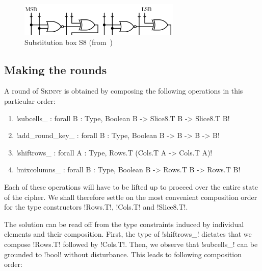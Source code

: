 \documentclass[draft,english]{jflart}
\newcommand{\Skinny}{\textsc{Skinny}}
\begin{document}
\begin{figure}
  \centering
  \includegraphics[draft=false,width=.75\textwidth]{s8}
  \caption{Substitution box S8 (from~\citet{beierle:skinny})}
  \label{fig:s8}
\end{figure}

\subsection{Making the rounds}
\label{sec:assembling}


A round of \Skinny{} is obtained by composing the following operations in
this particular order:
%
\begin{enumerate}
\item \coqe!subcells_ : forall {B : Type}, Boolean B -> Slice8.T B -> Slice8.T B!
\item \coqe!add_round_key_ : forall {B : Type}, Boolean B -> B -> B -> B!
\item \coqe!shiftrows_ : forall {A : Type}, Rows.T (Cols.T A -> Cols.T A)!
\item \coqe!mixcolumns_ : forall {B : Type}, Boolean B -> Rows.T B -> Rows.T B!
\end{enumerate}

Each of these operations will have to be lifted up to proceed over the
entire state of the cipher. We shall therefore settle on the most
convenient composition order for the type constructors \coqe!Rows.T!,
\coqe!Cols.T! and \coqe!Slice8.T!.


The solution can be read off from the type constraints induced by
individual elements and their composition. First, the type of
\coqe!shiftrows_! dictates that we compose \coqe!Rows.T! followed by
\coqe!Cols.T!. Then, we observe that \coqe!subcells_! can be grounded
to \coqe!bool! without disturbance. This leads to following 
composition order:
%
\end{document}
